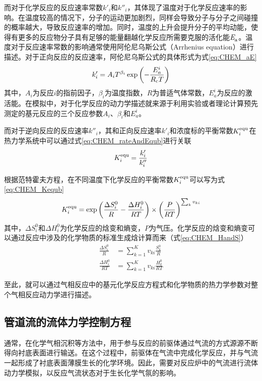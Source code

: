 而对于化学反应的反应速率常数$k'_i$和$k''_i$，其体现了温度对于化学反应速率的影响。在温度较高的情况下，分子的运动更加剧烈，同样会导致分子与分子之间碰撞的概率越大，导致反应速率的增加。同时，温度的上升会提升分子的平均动能，使得有更多的反应物分子具有足够的能量翻越化学反应所需要克服的活化能$\it E_{\rm a}^{\rm } \it$。温度对于反应速率常数的影响通常使用阿伦尼乌斯公式（Arrhenius equation）进行描述。对于正向反应的反应速率，阿伦尼乌斯公式的具体形式为式\eqref{eq:CHEM_aE}\chinesecolon
\begin{equation}
    \label{eq:CHEM_aE}
    k'_i=A_iT^{\beta_i}\exp\left(-\frac{E_a^i}{R_{\rm c}T}\right)
\end{equation}
其中，$A_i$为反应$i$的指前因子，$\beta_i$为温度指数，$R$为普适气体常数，$E_a^i$为反应的激活能。在模拟中，对于化学反应的动力学描述就来源于利用实验或者理论计算预先测定的基元反应的三个反应参数$A_i$、$\beta_i$和$E_a^i$。

而对于逆向反应的反应速率$k''_i$，其和正向反应速率$k'_i$和浓度标的平衡常数$K_i^{\rm equ}$在热力学系统中可以通过式\eqref{eq:CHEM_rateAndEqub}进行关联\chinesecolon
\begin{equation}
    \label{eq:CHEM_rateAndEqub}
    K_i^{\rm equ}=\frac{k'_i}{k''_i}
\end{equation}

根据范特霍夫方程，在不同温度下化学反应的平衡常数$K_i^{\rm equ}$可以写为式\eqref{eq:CHEM_Kequb}\chinesecolon
\begin{equation}
    \label{eq:CHEM_Kequb}
    K_i^{\rm equ}=\exp\left(\frac{\Delta S_i^0}{R}-\frac{\Delta H_i^0}{RT}\right)\times\left(\frac{P}{RT}\right)^{\sum_k v_{ki}}
\end{equation}
其中，$\Delta S_i^0$和$\Delta H_i^0$为化学反应的焓变和熵变，$P$为气压。化学反应的焓变和熵变可以通过反应中涉及的化学物质的标准生成焓计算而来（式\eqref{eq:CHEM_HandS}）\chinesecolon
\begin{equation}
    \label{eq:CHEM_HandS}
    \begin{split}
        \frac{\Delta S_i^0}{R}&=\sum_{k=1}^K v_{ki}\frac{S_k^0}{R}\\[+1ex]
        \frac{\Delta H_i^0}{RT}&=\sum_{k=1}^K v_{ki}\frac{H_k^0}{RT}
    \end{split}
\end{equation}

至此，就可以通过气相反应中的基元化学反应方程式和化学物质的热力学参数对整个气相反应动力学进行描述。

\subsection{管道流的流体力学控制方程}
通常，在化学气相沉积等方法中，用于参与反应的前驱体通过气流的方式源源不断得向衬底表面进行输送。在这个过程中，前驱体在气流中完成化学反应，并与气流一起形成了衬底表面薄膜生长的化学环境。因此，需要对反应炉中的气流进行流体动力学模拟，以反应气流状态对于生长化学气氛的影响。

